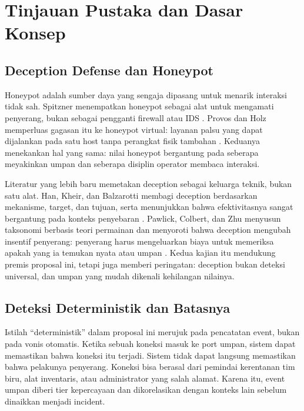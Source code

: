 \documentclass[12pt,a4paper]{article}
\begin{document}
\section{Tinjauan Pustaka dan Dasar Konsep}

\subsection{Deception Defense dan Honeypot}

Honeypot adalah sumber daya yang sengaja dipasang untuk menarik interaksi tidak sah. Spitzner menempatkan honeypot sebagai alat untuk mengamati penyerang, bukan sebagai pengganti firewall atau IDS \citep{spitzner2002}. Provos dan Holz memperluas gagasan itu ke honeypot virtual: layanan palsu yang dapat dijalankan pada satu host tanpa perangkat fisik tambahan \citep{provos2007}. Keduanya menekankan hal yang sama: nilai honeypot bergantung pada seberapa meyakinkan umpan dan seberapa disiplin operator membaca interaksi.

Literatur yang lebih baru memetakan deception sebagai keluarga teknik, bukan satu alat. Han, Kheir, dan Balzarotti membagi deception berdasarkan mekanisme, target, dan tujuan, serta menunjukkan bahwa efektivitasnya sangat bergantung pada konteks penyebaran \citep{han2018}. Pawlick, Colbert, dan Zhu menyusun taksonomi berbasis teori permainan dan menyoroti bahwa deception mengubah insentif penyerang: penyerang harus mengeluarkan biaya untuk memeriksa apakah yang ia temukan nyata atau umpan \citep{pawlick2019}. Kedua kajian itu mendukung premis proposal ini, tetapi juga memberi peringatan: deception bukan deteksi universal, dan umpan yang mudah dikenali kehilangan nilainya.

\subsection{Deteksi Deterministik dan Batasnya}

Istilah ``deterministik'' dalam proposal ini merujuk pada pencatatan event, bukan pada vonis otomatis. Ketika sebuah koneksi masuk ke port umpan, sistem dapat memastikan bahwa koneksi itu terjadi. Sistem tidak dapat langsung memastikan bahwa pelakunya penyerang. Koneksi bisa berasal dari pemindai kerentanan tim biru, alat inventaris, atau administrator yang salah alamat. Karena itu, event umpan diberi tier kepercayaan dan dikorelasikan dengan konteks lain sebelum dinaikkan menjadi incident.
\end{document}

